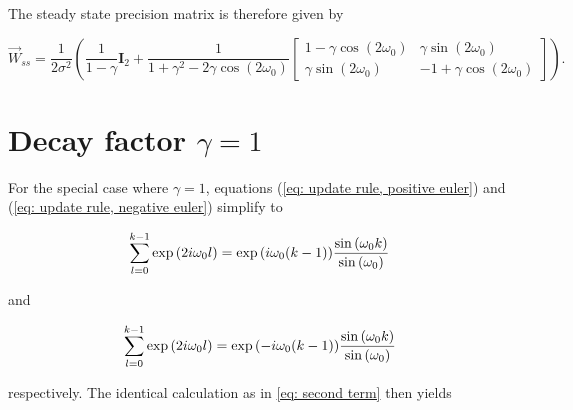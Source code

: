 \documentclass[11pt,a4paper,twoside]{report}
\newcommand{\mat}[1]{\mathbf{#1}}
\begin{document}
\noindent The steady state precision matrix is therefore given by

\begin{equation*}
	\overrightarrow{W}_{ss} = \frac{1}{2\sigma^2}\left(\frac{1}{1-\gamma}\mat{I}_2 + \frac{1}{1+\gamma^2 - 2 \gamma \cos\left( 2\omega_0 \right)}
		\begin{bmatrix}
			1 - \gamma \cos\left( 2\omega_0 \right)&  \gamma \sin\left( 2 \omega_0 \right) \\
			  \gamma \sin\left( 2 \omega_0 \right) &- 1 + \gamma \cos\left( 2\omega_0 \right)
		\end{bmatrix}\right) .
\end{equation*}



\section*{Decay factor $\gamma = 1$ }

\noindent For the special case where $\gamma = 1$, equations (\ref{eq: update rule, positive euler}) and (\ref{eq: update rule, negative euler}) simplify to

\begin{equation*}
	\label{eq: update rule, geometric series}
	\sum_{l=0}^{k-1}\exp{\left(2i\omega_0l\right)}= \exp{\left(i\omega_0(k-1)\right)}\frac{\sin\left(\omega_0 k\right)}{ \sin\left(\omega_0\right)} \\
\end{equation*}

\noindent and

\begin{equation*}
	\label{eq: update rule, geometric series}
	\sum_{l=0}^{k-1}\exp{\left(2i\omega_0l\right)}= \exp{\left(-i\omega_0(k-1)\right)}\frac{\sin\left(\omega_0 k\right)}{ \sin\left(\omega_0\right)} \\
\end{equation*}

\noindent respectively. The identical calculation as in \ref{eq: second term} then yields
\end{document}
